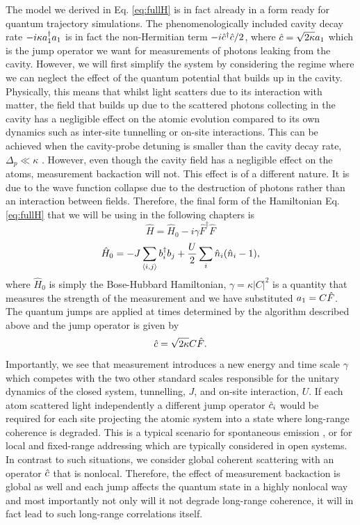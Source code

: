 The model we derived in Eq. \eqref{eq:fullH} is in fact already in a
form ready for quantum trajectory simulations. The phenomenologically
included cavity decay rate $-i \kappa a^\dagger_1 a_1$ is in fact the
non-Hermitian term $-i \hat{c}^\dagger \hat{c} / 2$, where $\hat{c} = \sqrt{2 \kappa} a_1$
which is the jump operator we want for measurements of photons leaking
from the cavity. However, we will first simplify the system by
considering the regime where we can neglect the effect of the quantum
potential that builds up in the cavity. Physically, this means that
whilst light scatters due to its interaction with matter, the field
that builds up due to the scattered photons collecting in the cavity
has a negligible effect on the atomic evolution compared to its own
dynamics such as inter-site tunnelling or on-site interactions. This
can be achieved when the cavity-probe detuning is smaller than the
cavity decay rate, $\Delta_p \ll \kappa$
\cite{caballero2015}. However, even though the cavity field has a
negligible effect on the atoms, measurement backaction will not. This
effect is of a different nature. It is due to the wave function
collapse due to the destruction of photons rather than an interaction
between fields. Therefore, the final form of the Hamiltonian
Eq. \eqref{eq:fullH} that we will be using in the following chapters
is
\begin{equation}
  \label{eq:backaction}
  \hat{H} = \hat{H}_0 - i \gamma \hat{F}^\dagger \hat{F}
\end{equation}
\begin{equation}
  \hat{H}_0 = -J \sum_{\langle i, j \rangle} b^\dagger_i b_j + \frac{U}{2}
                \sum_i \hat{n}_i (\hat{n}_i - 1),
\end{equation}
where $\hat{H}_0$ is simply the Bose-Hubbard Hamiltonian,
$\gamma = \kappa |C|^2$ is a quantity that measures the strength of
the measurement and we have substituted $a_1 = C \hat{F}$. The
quantum jumps are applied at times determined by the algorithm
described above and the jump operator is given by
\begin{equation}
  \label{eq:jumpop}
  \hat{c} = \sqrt{2 \kappa} C \hat{F}.
\end{equation}
Importantly, we see that measurement introduces a new energy and time
scale $\gamma$ which competes with the two other standard scales
responsible for the unitary dynamics of the closed system, tunnelling,
$J$, and on-site interaction, $U$.  If each atom scattered light
independently a different jump operator $\hat{c}_i$ would be required for
each site projecting the atomic system into a state where long-range
coherence is degraded. This is a typical scenario for spontaneous
emission \cite{pichler2010, sarkar2014}, or for local
\cite{syassen2008, kepesidis2012, vidanovic2014, bernier2014,
  daley2014} and fixed-range addressing \cite{ates2012, everest2014}
which are typically considered in open systems. In contrast to such
situations, we consider global coherent scattering with an operator
$\hat{c}$ that is nonlocal. Therefore, the effect of measurement backaction
is global as well and each jump affects the quantum state in a highly
nonlocal way and most importantly not only will it not degrade
long-range coherence, it will in fact lead to such long-range
correlations itself.

